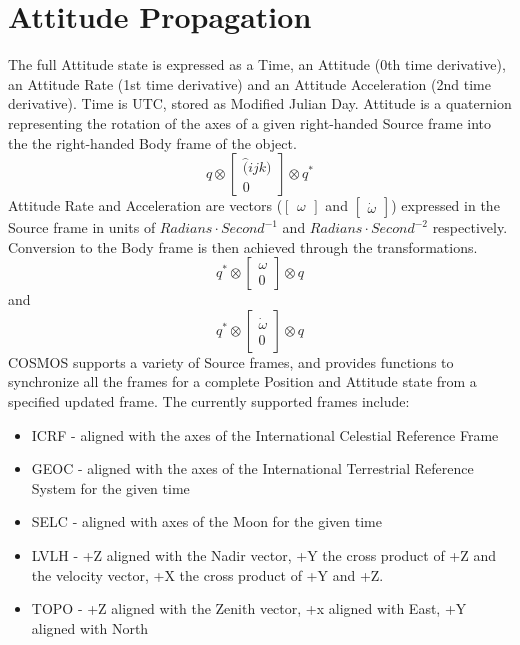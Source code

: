 \documentclass[12pt,letterpaper]{paper}
\begin{document}
\section{Attitude Propagation}
The full Attitude state is expressed as a Time, an Attitude (0th time derivative), an Attitude Rate (1st time derivative) and an Attitude Acceleration (2nd time derivative). Time is UTC, stored as Modified Julian Day. Attitude is a quaternion representing the rotation of the axes of a given right-handed Source frame into the the right-handed Body frame of the object.
\[q \otimes \begin{bmatrix} \hat(ijk)\\0 \end{bmatrix} \otimes q^{*}\]
Attitude Rate and Acceleration are vectors ($\begin{bmatrix}\omega\end{bmatrix}$ and $\begin{bmatrix}\dot{\omega}\end{bmatrix}$) expressed in the Source frame in units of $Radians \cdot Second^{-1}$ and $Radians \cdot Second^{-2}$ respectively. Conversion to the Body frame is then achieved through the transformations.
\[q^{*} \otimes \begin{bmatrix} \omega\\0 \end{bmatrix} \otimes q\] and \[q^{*} \otimes \begin{bmatrix} \dot{\omega}\\0 \end{bmatrix} \otimes q\]
COSMOS supports a variety of Source frames, and provides functions to synchronize all the frames for a complete Position and Attitude state from a specified updated frame. The currently supported frames include:
\begin{itemize}
\item ICRF - aligned with the axes of the International Celestial Reference Frame
\item GEOC - aligned with the axes of the International Terrestrial Reference System for the given time
\item SELC - aligned with axes of the Moon for the given time
\item LVLH - +Z aligned with the Nadir vector, +Y the cross product of +Z and the velocity vector, +X the cross product of +Y and +Z.
\item TOPO - +Z aligned with the Zenith vector, +x aligned with East, +Y aligned with North
\end{itemize}
\end{document}
